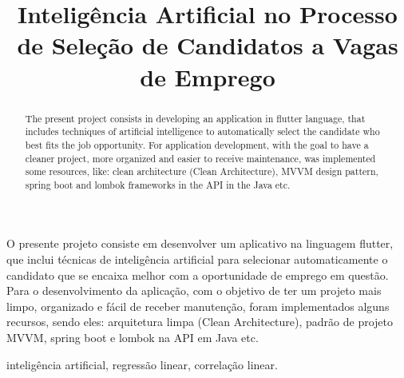 \documentclass[conference]{IEEEtran}
\begin{document}
\title{Inteligência Artificial no Processo de Seleção de Candidatos a Vagas de Emprego\\

}

\author{
\and
{}
}

\maketitle

\begin{resumo}
O presente projeto consiste em desenvolver um aplicativo na linguagem flutter, que inclui técnicas de inteligência artificial para selecionar automaticamente o candidato que se encaixa melhor com a oportunidade de emprego em questão. Para o desenvolvimento da aplicação, com o objetivo de ter um projeto mais limpo, organizado e fácil de receber manutenção, foram implementados alguns recursos, sendo eles: arquitetura limpa (Clean Architecture), padrão de projeto MVVM, spring boot e lombok na API em Java etc.
\end{resumo}

\begin{IEEEpalavrachave}
inteligência artificial, regressão linear, correlação linear.
\end{IEEEpalavrachave}

\begin{abstract}
The present project consists in developing an application in flutter language, that includes techniques of artificial intelligence to automatically select the candidate who best fits the job opportunity. For application development, with the goal to have a cleaner project, more organized and easier to receive maintenance, was implemented some resources, like: clean architecture (Clean Architecture), MVVM design pattern, spring boot and lombok frameworks in the API in the Java etc.
\end{abstract}
\end{document}
